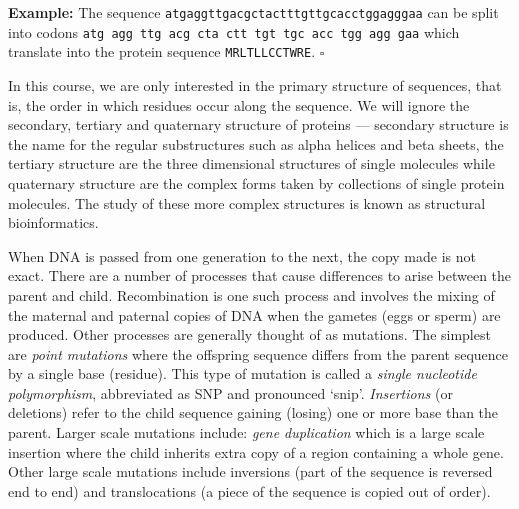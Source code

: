 \documentclass[11pt]{article}
\newcommand{\sqend}{\hfill $\square$}
\begin{document}
{\bf Example:} The sequence {\tt atgaggttgacgctactttgttgcacctggagggaa} can be split into codons {\tt atg agg ttg acg cta ctt tgt tgc acc tgg agg gaa} which translate into the protein sequence {\tt MRLTLLCCTWRE}. \sqend

In this course, we are only interested in the primary structure of sequences, that is, the order in which residues occur along the sequence.  We will ignore the secondary, tertiary and quaternary structure of proteins ---  secondary structure is the name for  the regular substructures such as alpha helices and beta sheets, the tertiary structure are the three dimensional structures of single molecules while quaternary structure are the complex forms taken by collections of single protein molecules.  The study of these more complex structures is known as structural bioinformatics.

When DNA is passed from one generation to the next, the copy made is not exact.    There are a number of processes that cause differences to arise between the parent and child.  Recombination is one such process and involves the mixing of the maternal and paternal copies of DNA when the gametes (eggs or sperm) are produced.  Other processes are generally thought of as mutations.  The simplest are {\em point mutations} where the offspring sequence differs from the parent sequence by a single base (residue).  This type of mutation is called a {\em single nucleotide polymorphism}, abbreviated as SNP and pronounced `snip'.   {\em Insertions} (or deletions) refer to the child sequence gaining (losing) one or more base than the parent.  Larger scale mutations include: {\em gene duplication} which is a large scale  insertion where the child inherits  extra copy of a region containing a whole gene.  Other large scale  mutations include inversions (part of the sequence is reversed end to end) and translocations (a piece of the sequence is copied out of order).
\end{document}
